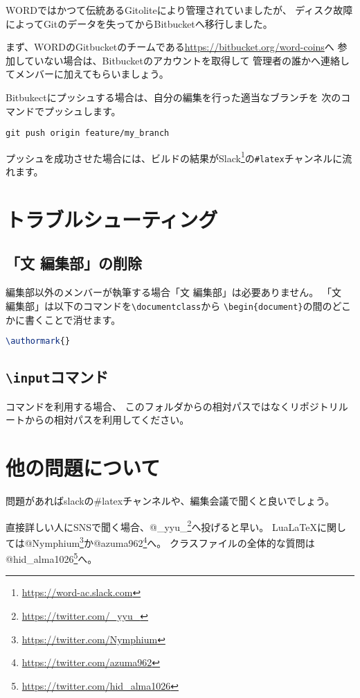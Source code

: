 \documentclass[../../main]{subfiles}
\begin{document}
WORDではかつて伝統あるGitoliteにより管理されていましたが、
ディスク故障によってGitのデータを失ってからBitbucketへ移行しました。

まず、WORDのGitbucketのチームである\url{https://bitbucket.org/word-coins}へ
参加していない場合は、Bitbucketのアカウントを取得して
管理者の誰かへ連絡してメンバーに加えてもらいましょう。

Bitbukectにプッシュする場合は、自分の編集を行った適当なブランチを
次のコマンドでプッシュします。

\begin{lstlisting}[mathescape]
git push origin feature/my_branch
\end{lstlisting}

プッシュを成功させた場合には、ビルドの結果がSlack\footnote{\url{https://word-ac.slack.com}}の\texttt{\#latex}チャンネルに流れます。

\section{トラブルシューティング}

\subsection{「文 編集部」の削除}

編集部以外のメンバーが執筆する場合「文 編集部」は必要ありません。
「文　編集部」は以下のコマンドを\lstinline|\documentclass|から
\lstinline|\begin{document}|の間のどこかに書くことで消せます。

\begin{lstlisting}[language=TeX, mathescape]
\authormark{}    
\end{lstlisting}

\subsection{\texttt{\textbackslash input}コマンド}

\lstinline||コマンドを利用する場合、
このフォルダからの相対パスではなくリポジトリルートからの相対パスを利用してください。

\section{他の問題について}

問題があればslackの\#latexチャンネルや、編集会議で聞くと良いでしょう。

直接詳しい人にSNSで聞く場合、@\_yyu\_\footnote{\url{https://twitter.com/_yyu_}}へ投げると早い。
Lua\LaTeX に関しては@Nymphium\footnote{\url{https://twitter.com/Nymphium}}か@azuma962\footnote{\url{https://twitter.com/azuma962}}へ。
クラスファイルの全体的な質問は@hid\_alma1026\footnote{\url{https://twitter.com/hid_alma1026}}へ。
\end{document}
